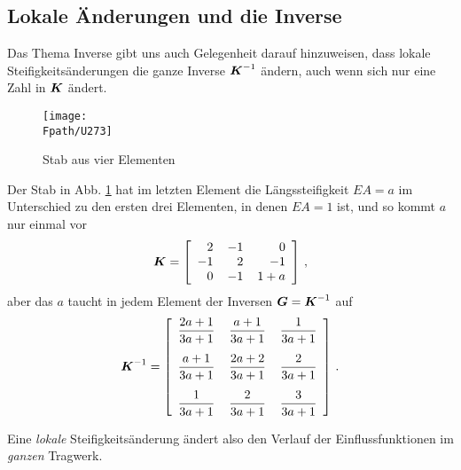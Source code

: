 {\pagebreak
{\textcolor{sectionTitleBlue}{\section{Lokale \"{A}nderungen und die Inverse}}}
Das Thema Inverse gibt uns auch Gelegenheit darauf hinzuweisen, dass lokale Steifigkeits\"{a}nderungen die ganze Inverse $\mbox{\boldmath $K$}^{-1}$ \"{a}ndern, auch wenn sich nur eine Zahl in $\mbox{\boldmath $K$}$ \"{a}ndert.
\begin{figure}
\centering
{\texttt{[image: \\Fpath/U273]}}
  \caption{Stab aus vier Elementen}
  \label{U273}
\end{figure}%


Der Stab in Abb. \ref{U273} hat im letzten Element die L\"{a}ngssteifigkeit $EA = a$ im Unterschied zu den ersten drei Elementen, in denen $EA = 1$ ist, und so kommt $a$ nur einmal vor
\begin{align}
\vek K = \left[ \barr{r @{\hspace{4mm}}r @{\hspace{4mm}}r} 2 &-1 &0 \\ -1 &2 &-1 \\ 0 &-1 &1 + a\earr\right]\,,
\end{align}
aber das $a$ taucht in jedem Element der Inversen $\mbox{\boldmath $G$} = \mbox{\boldmath $K$}^{-1}$ auf
\begin{align}
\vek K^{-1} = \left[
\begin{array}{c@{\hspace{4mm}}c@{\hspace{4mm}}c}
 \displaystyle{\frac{2 a+1}{3 a+1}} & \displaystyle{\frac{a+1}{3 a+1}} & \displaystyle{\frac{1}{3 a+1} }\vspace{0.3cm}\\
 \displaystyle{\frac{a+1}{3 a+1}} & \displaystyle{\frac{2 a+2}{3 a+1}} & \displaystyle{\frac{2}{3 a+1}} \vspace{0.3cm}\\
 \displaystyle{\frac{1}{3 a+1}} & \displaystyle{\frac{2}{3 a+1}}& \displaystyle{\frac{3}{3 a+1}}
\end{array}
\right]\,.
\end{align}

\hspace*{-12pt}\colorbox{highlightBlue}{\parbox{0.98\textwidth}{Eine {\em lokale\/} Steifigkeits\"{a}nderung \"{a}ndert also den Verlauf der Einflussfunktionen im {\em ganzen\/} Tragwerk.}}\\

}
